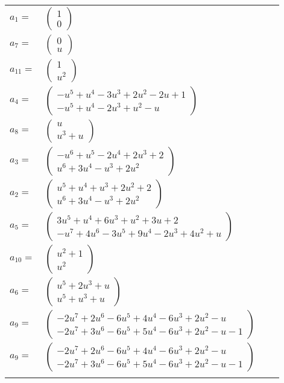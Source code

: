 \documentclass[1p]{elsarticle_modified}
\theoremstyle{definition}
\begin{document}
\begin{tabular}{m{7pt} m{180pt} m{7pt} m{180pt} }
\flushright $a_{1}=$&$\begin{pmatrix}1\\0\end{pmatrix}$ \\
\flushright $a_{7}=$&$\begin{pmatrix}0\\u\end{pmatrix}$ \\
\flushright $a_{11}=$&$\begin{pmatrix}1\\u^2\end{pmatrix}$ \\
\flushright $a_{4}=$&$\begin{pmatrix}- u^5+u^4-3 u^3+2 u^2-2 u+1\\- u^5+u^4-2 u^3+u^2- u\end{pmatrix}$ \\
\flushright $a_{8}=$&$\begin{pmatrix}u\\u^3+u\end{pmatrix}$ \\
\flushright $a_{3}=$&$\begin{pmatrix}- u^6+u^5-2 u^4+2 u^3+2\\u^6+3 u^4- u^3+2 u^2\end{pmatrix}$ \\
\flushright $a_{2}=$&$\begin{pmatrix}u^5+u^4+u^3+2 u^2+2\\u^6+3 u^4- u^3+2 u^2\end{pmatrix}$ \\
\flushright $a_{5}=$&$\begin{pmatrix}3 u^5+u^4+6 u^3+u^2+3 u+2\\- u^7+4 u^6-3 u^5+9 u^4-2 u^3+4 u^2+u\end{pmatrix}$ \\
\flushright $a_{10}=$&$\begin{pmatrix}u^2+1\\u^2\end{pmatrix}$ \\
\flushright $a_{6}=$&$\begin{pmatrix}u^5+2 u^3+u\\u^5+u^3+u\end{pmatrix}$ \\
\flushright $a_{9}=$&$\begin{pmatrix}-2 u^7+2 u^6-6 u^5+4 u^4-6 u^3+2 u^2- u\\-2 u^7+3 u^6-6 u^5+5 u^4-6 u^3+2 u^2- u-1\end{pmatrix}$\\ \flushright $a_{9}=$&$\begin{pmatrix}-2 u^7+2 u^6-6 u^5+4 u^4-6 u^3+2 u^2- u\\-2 u^7+3 u^6-6 u^5+5 u^4-6 u^3+2 u^2- u-1\end{pmatrix}$\\&\end{tabular}
\end{document}
